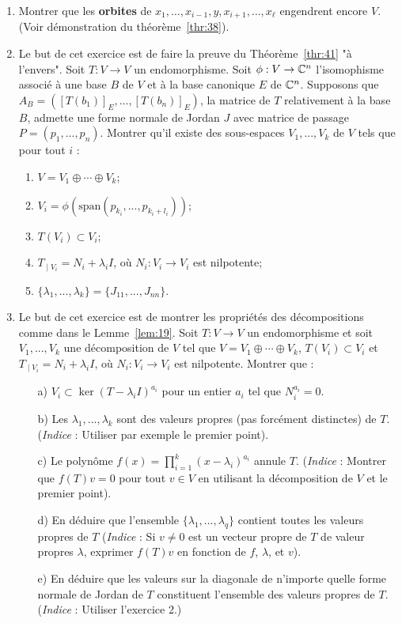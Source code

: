 \begin{enumerate}
\item Montrer que les \textbf{orbites} de 
$ x_1,\dots, x_{i-1},y,x_{i+1},\dots,x_\ell $ engendrent encore $V$. (Voir démonstration du théorème~\ref{thr:38}). 

\item Le but de cet exercice est de faire la preuve du Théorème~\ref{thr:41} "à l'envers". \newline
Soit $T \colon V \rightarrow V$ un endomorphisme. Soit $\phi : V \rightarrow \Bbb C^n$ l'isomophisme associé à une base $B$ de $V$ et à la base canonique $E$ de $\Bbb C^n$. Supposons que $A_{B} = ([T(b_1)]_E, ..., [T(b_n)]_E)$, la matrice de $T$ relativement à la base $B$, admette une forme normale de Jordan $J$ avec matrice de passage $P = (p_1, ..., p_n)$. \newline
Montrer qu'il existe des sous-espaces $V_1, ..., V_k$  de $V$ tels que pour tout $i$ :
\begin{enumerate}
\item $V = V_1 \oplus \cdots \oplus V_k$;
\item $V_i = \phi(\text{span}(p_{k_i}, ..., p_{k_i + l_i}))$;
\item $T(V_i) \subset V_i$;
\item $T_{∣V_i} = N_i + \lambda_i I$, où $N_i \colon V_i \rightarrow V_i$ est nilpotente;
\item $\{\lambda_1, ..., \lambda_k\} = \{J_{11}, ..., J_{nn}\}$.
\end{enumerate} 

\item Le but de cet exercice est de montrer les propriétés des décompositions comme dans le Lemme~\ref{lem:19}. \newline
Soit $T \colon V \rightarrow V$ un endomorphisme et soit $V_1, ..., V_k$ une décomposition de $V$ tel que $V = V_1 ⊕ \cdots ⊕ V_k$, $T(V_i) \subset V_i$ et $T_{∣V_i} = N_i + \lambda_i I$, où $N_i : V_i \rightarrow V_i$ est nilpotente. Montrer que :
\begin{enumerate}
\item[a)] $V_i \subset \ker (T - \lambda_i I)^{a_i}$ pour un entier $a_i$ tel que $N_i^{a_i} = 0$.
\item[b)] Les $\lambda_1, ..., \lambda_k$ sont des valeurs propres (pas forcément distinctes) de $T$. (\textit{Indice} : Utiliser par exemple le premier point).
\item[c)] Le polynôme $f(x) = \prod_{i=1}^{k} (x - \lambda_i)^{a_i}$ annule $T$. (\textit{Indice} : Montrer que $f(T)v = 0$ pour tout $v \in V$ en utilisant la décomposition de $V$ et le premier point).
\item[d)] En déduire que l'ensemble $\{ \lambda_1, ..., \lambda_q \}$ contient toutes les valeurs propres de $T$ (\textit{Indice} : Si $v \neq 0$ est un vecteur propre de $T$ de valeur propres $\lambda$, exprimer $f(T)v$ en fonction de $f$, $\lambda$, et $v$). 
\item[e)] En déduire que les valeurs sur la diagonale de n'importe quelle forme normale de Jordan de $T$ constituent l'ensemble des valeurs propres de $T$. (\textit{Indice} : Utiliser l'exercice 2.)
\end{enumerate}


\end{enumerate}
